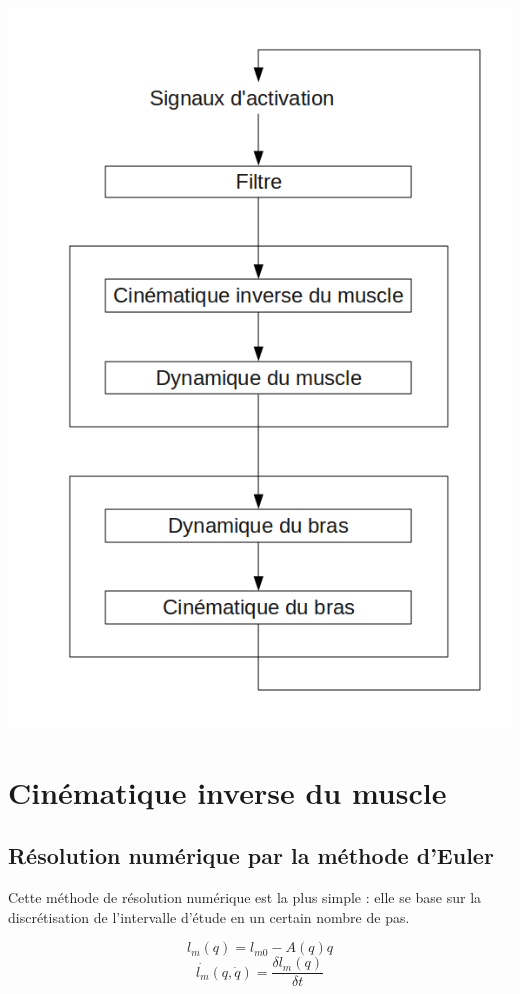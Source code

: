 \documentclass[pdftex,a4paper,11pt]{article}
\numberwithin{equation}{subsection}
\begin{document}
\paragraph{}
\begin{center}
        \includegraphics[width=.60\linewidth]{fig/modules}
\end{center}


\section{Cinématique inverse du muscle}

\subsection{Résolution numérique par la méthode d'Euler}

Cette méthode de résolution numérique est la plus simple : elle se base sur la discrétisation de l'intervalle d'étude en un certain nombre de pas.

\[l_m(q) = l_{m0} - A(q) q\]
\[\dot{l_m}(q, \dot{q}) = \frac{\delta l_m(q)}{\delta t}\]
\end{document}
